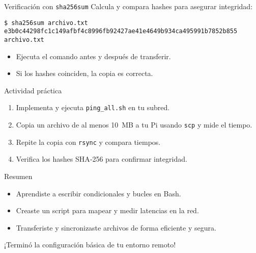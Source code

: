 \documentclass[aspectratio=169,professionalfonts]{beamer}
\begin{document}
\begin{frame}[fragile]{Verificación con \texttt{sha256sum}}
  Calcula y compara hashes para asegurar integridad:
  \begin{verbatim}
$ sha256sum archivo.txt
e3b0c44298fc1c149afbf4c8996fb92427ae41e4649b934ca495991b7852b855  archivo.txt
  \end{verbatim}
  \begin{itemize}
    \item Ejecuta el comando antes y después de transferir.
    \item Si los hashes coinciden, la copia es correcta.
  \end{itemize}
\end{frame}

\begin{frame}[fragile]{Actividad práctica}
  \begin{enumerate}
    \item Implementa y ejecuta \texttt{ping\_all.sh} en tu subred.
    \item Copia un archivo de al menos 10 MB a tu Pi usando \texttt{scp} y mide el tiempo.
    \item Repite la copia con \texttt{rsync} y compara tiempos.
    \item Verifica los hashes SHA‑256 para confirmar integridad.
  \end{enumerate}
\end{frame}

\begin{frame}[fragile]{Resumen}
  \begin{itemize}
    \item Aprendiste a escribir condicionales y bucles en Bash.
    \item Creaste un script para mapear y medir latencias en la red.
    \item Transferiste y sincronizaste archivos de forma eficiente y segura.
  \end{itemize}
  \vspace{0.5em}
  ¡Terminó la configuración básica de tu entorno remoto!
\end{frame}
\end{document}

